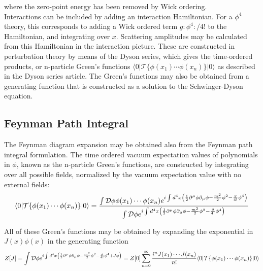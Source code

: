 where the zero-point energy has been removed by Wick ordering.\\

Interactions can be included by adding an interaction Hamiltonian. For a $\phi^4$ theory, this corresponds to adding a Wick ordered term $g:\phi^4:/4!$ to the Hamiltonian, and integrating over $x$. Scattering amplitudes may be calculated from this Hamiltonian in the interaction picture. These are constructed in perturbation theory by means of the Dyson series, which gives the time-ordered products, or n-particle Green's functions $\langle 0|\mathcal{T}\{{\phi}(x_1)\cdots {\phi}(x_n)\}|0\rangle$ as described in the Dyson series article. The Green's functions may also be obtained from a generating function that is constructed as a solution to the Schwinger-Dyson equation.\\

\subsection{Feynman Path Integral}

The Feynman diagram expansion may be obtained also from the Feynman path integral formulation. The time ordered vacuum expectation values of polynomials in $\phi$, known as the n-particle Green's functions, are constructed by integrating over all possible fields, normalized by the vacuum expectation value with no external fields:\\

\begin{equation}
    \langle 0|\mathcal{T}\{{\phi}(x_1)\cdots {\phi}(x_n)\}|0\rangle=\frac{\int \mathcal{D}\phi \phi(x_1)\cdots \phi(x_n) e^{i\int d^4x \left({1\over 2}\partial^\mu \phi \partial_\mu \phi -{m^2 \over 2}\phi^2-{g\over 4!}\phi^4\right)}}{\int \mathcal{D}\phi e^{i\int d^4x \left({1\over 2}\partial^\mu \phi \partial_\mu \phi -{m^2 \over 2}\phi^2-{g\over 4!}\phi^4\right)}}
\end{equation}

All of these Green's functions may be obtained by expanding the exponential in $J(x)\phi(x)$ in the generating function\\

\begin{equation}
    Z[J] =\int \mathcal{D}\phi e^{i\int d^4x \left({1\over 2}\partial^\mu \phi \partial_\mu \phi -{m^2 \over 2}\phi^2-{g\over 4!}\phi^4+J\phi\right)} = Z[0] \sum_{n=0}^{\infty} \frac{i^n J(x_1) \cdots J(x_n)}{n!} \langle 0|\mathcal{T}\{{\phi}(x_1)\cdots {\phi}(x_n)\}|0\rangle
\end{equation}

